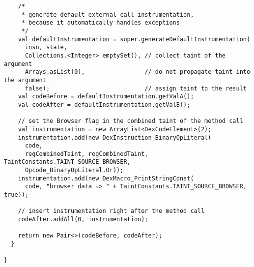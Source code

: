 \begin{lstlisting}
    /*
     * generate default external call instrumentation,
     * because it automatically handles exceptions
     */
    val defaultInstrumentation = super.generateDefaultInstrumentation(
      insn, state,
      Collections.<Integer> emptySet(), // collect taint of the argument
      Arrays.asList(0),                 // do not propagate taint into the argument
      false);                           // assign taint to the result
    val codeBefore = defaultInstrumentation.getValA();
    val codeAfter = defaultInstrumentation.getValB();

    // set the Browser flag in the combined taint of the method call
    val instrumentation = new ArrayList<DexCodeElement>(2);
    instrumentation.add(new DexInstruction_BinaryOpLiteral(
      code, 
      regCombinedTaint, regCombinedTaint, TaintConstants.TAINT_SOURCE_BROWSER, 
      Opcode_BinaryOpLiteral.Or));
    instrumentation.add(new DexMacro_PrintStringConst(
      code, "browser data => " + TaintConstants.TAINT_SOURCE_BROWSER, true));

    // insert instrumentation right after the method call
    codeAfter.addAll(0, instrumentation);

    return new Pair<>(codeBefore, codeAfter);
  }

}
\end{lstlisting}